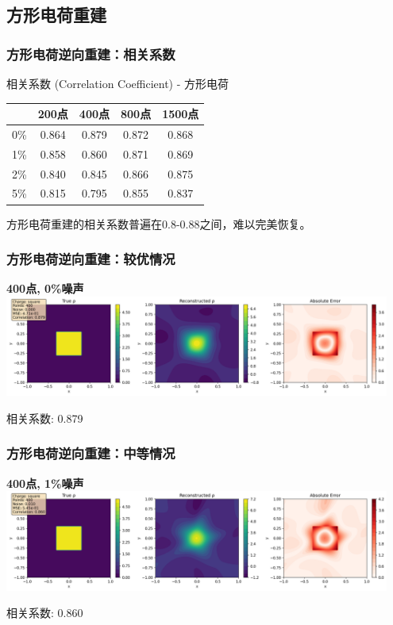 \documentclass[aspectratio=169]{ctexbeamer}
\begin{document}
\subsection{方形电荷重建}
\begin{frame}
  \frametitle{方形电荷逆向重建：相关系数}
  \begin{block}{相关系数 (Correlation Coefficient) - 方形电荷}
    \centering
    \begin{tabular}{c|cccc}
        \toprule
         & 200点 & 400点 & 800点 & 1500点 \\
        \midrule
        0\%   & 0.864 & 0.879 & 0.872 & 0.868 \\
        1\%   & 0.858 & 0.860 & 0.871 & 0.869 \\
        2\%   & 0.840 & 0.845 & 0.866 & 0.875 \\
        5\%   & 0.815 & 0.795 & 0.855 & 0.837 \\
        \bottomrule
    \end{tabular}

    \small 方形电荷重建的相关系数普遍在0.8-0.88之间，难以完美恢复。
  \end{block}
\end{frame}
\begin{frame}
	\frametitle{方形电荷逆向重建：较优情况}
	\begin{center}
		\textbf{400点, 0\%噪声}\\
		\includegraphics[width=0.95\textwidth]{figures/inverse_square_400pts_0noise_combined.png}

		\small 相关系数: 0.879
	\end{center}
\end{frame}

\begin{frame}
	\frametitle{方形电荷逆向重建：中等情况}
	\begin{center}
		\textbf{400点, 1\%噪声}\\
		\includegraphics[width=0.95\textwidth]{figures/inverse_square_400pts_1noise_combined.png}

		\small 相关系数: 0.860
	\end{center}
\end{frame}
\end{document}
